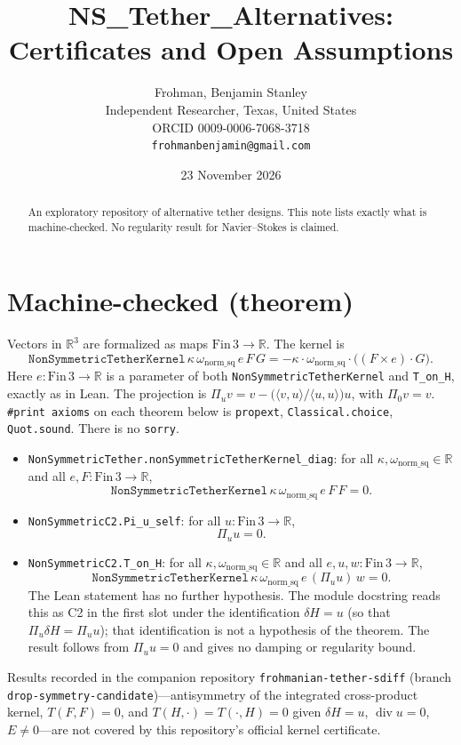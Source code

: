 \documentclass[11pt]{article}
\title{NS\_Tether\_Alternatives: Certificates and Open Assumptions}
\author{Frohman, Benjamin Stanley\\
Independent Researcher, Texas, United States\\
ORCID 0009-0006-7068-3718\\
\texttt{frohmanbenjamin@gmail.com}}
\date{23 November 2026}
\begin{document}
\maketitle
\begin{abstract}
An exploratory repository of alternative tether designs. This note lists exactly what is machine-checked. No regularity result for Navier--Stokes is claimed.
\end{abstract}
\section{Machine-checked (theorem)}
Vectors in $\mathbb{R}^3$ are formalized as maps $\mathrm{Fin}\,3\to\mathbb{R}$.
The kernel is
\[
\texttt{NonSymmetricTetherKernel}\,\kappa\,\omega_{\mathrm{norm\_sq}}\,e\,F\,G
=-\kappa\cdot\omega_{\mathrm{norm\_sq}}\cdot\bigl((F\times e)\cdot G\bigr).
\]
Here $e:\mathrm{Fin}\,3\to\mathbb{R}$ is a parameter of both \texttt{NonSymmetricTetherKernel} and \texttt{T\_on\_H}, exactly as in Lean.
The projection is $\Pi_u v=v-\bigl(\langle v,u\rangle/\langle u,u\rangle\bigr)u$, with $\Pi_0 v=v$.
\texttt{\#print axioms} on each theorem below is \texttt{propext}, \texttt{Classical.choice}, \texttt{Quot.sound}. There is no \texttt{sorry}.
\begin{itemize}
\item \texttt{NonSymmetricTether.nonSymmetricTetherKernel\_diag}:
for all $\kappa,\omega_{\mathrm{norm\_sq}}\in\mathbb{R}$ and all $e,F:\mathrm{Fin}\,3\to\mathbb{R}$,
\[
\texttt{NonSymmetricTetherKernel}\,\kappa\,\omega_{\mathrm{norm\_sq}}\,e\,F\,F=0.
\]
\item \texttt{NonSymmetricC2.Pi\_u\_self}:
for all $u:\mathrm{Fin}\,3\to\mathbb{R}$,
\[
\Pi_u u=0.
\]
\item \texttt{NonSymmetricC2.T\_on\_H}:
for all $\kappa,\omega_{\mathrm{norm\_sq}}\in\mathbb{R}$ and all $e,u,w:\mathrm{Fin}\,3\to\mathbb{R}$,
\[
\texttt{NonSymmetricTetherKernel}\,\kappa\,\omega_{\mathrm{norm\_sq}}\,e\,(\Pi_u u)\,w=0.
\]
The Lean statement has no further hypothesis. The module docstring reads this as C2 in the first slot under the identification $\delta H=u$ (so that $\Pi_u\delta H=\Pi_u u$); that identification is not a hypothesis of the theorem. The result follows from $\Pi_u u=0$ and gives no damping or regularity bound.
\end{itemize}
{\sloppy Results recorded in the companion repository
\texttt{frohmanian-tether-sdiff}
(branch \texttt{drop-symmetry-candidate})---antisymmetry of the integrated cross-product kernel, $T(F,F)=0$, and $T(H,\cdot)=T(\cdot,H)=0$ given $\delta H=u$, $\operatorname{div}u=0$, $E\neq0$---are not covered by this repository's official kernel certificate.
\par}
\end{document}
